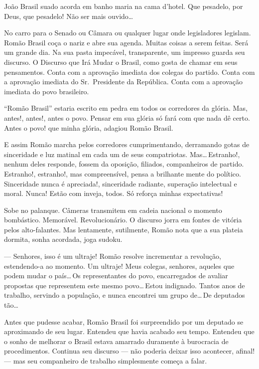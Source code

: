 João Brasil suado acorda em banho maria na cama d'hotel. Que pesadelo, por Deus, que pesadelo! Não ser mais ouvido\ldots



No carro para o Senado ou Câmara ou qualquer lugar onde legisladores legislam. Romão Brasil coça o nariz e abre sua agenda. Muitas coisas a serem feitas. Será um grande dia. Na sua pasta impecável, transparente, um impresso guarda seu discurso. O Discurso que Irá Mudar o Brasil, como gosta de chamar em seus pensamentos. Conta com a aprovação imediata dos colegas do partido. Conta com a aprovação imediata do Sr.~Presidente da República. Conta com a aprovação imediata do povo brasileiro.

``Romão Brasil'' estaria escrito em pedra em todos os corredores da glória. Mas, antes!, antes!, antes o povo. Pensar em sua glória só fará com que nada dê certo. Antes o povo! que minha glória, adagiou Romão Brasil.

E assim Romão marcha pelos corredores cumprimentando, derramando gotas de sinceridade e luz matinal em cada um de seus compatriotas. Mas\ldots\,Estranho!, nenhum deles responde, fossem da oposição, filiados, companheiros de partido. Estranho!, estranho!, mas compreensível, pensa a brilhante mente do político. Sinceridade nunca é apreciada!, sinceridade radiante, superação intelectual e moral. Nunca! Estão com inveja, todos. Só reforça minhas expectativas!

Sobe no palanque. Câmeras transmitem em cadeia nacional o momento bombástico. Memorável. Revolucionário. O discurso jorra em fontes de vitória pelos alto-falantes. Mas lentamente, sutilmente, Romão nota que a sua plateia dormita, sonha acordada, joga sudoku.

\begin{sloppypar}
--- Senhores, isso é um ultraje! Romão resolve incrementar a revolução, estendendo-a ao momento. Um ultraje! Meus colegas, senhores, aqueles que podem mudar o país\ldots\,Os representantes do povo, encarregados de avaliar propostas que representem este mesmo povo\ldots\,Estou indignado. Tantos anos de trabalho, servindo a população, e nunca encontrei um grupo de\ldots\,De deputados tão\ldots
\end{sloppypar}

Antes que pudesse acabar, Romão Brasil foi surpreendido por um deputado se aproximando de seu lugar. Entendeu que havia acabado seu tempo. Entendeu que o sonho de melhorar o Brasil estava amarrado duramente à burocracia de procedimentos. Continua seu discurso --- não poderia deixar isso acontecer, afinal! --- mas seu companheiro de trabalho simplesmente começa a falar.

